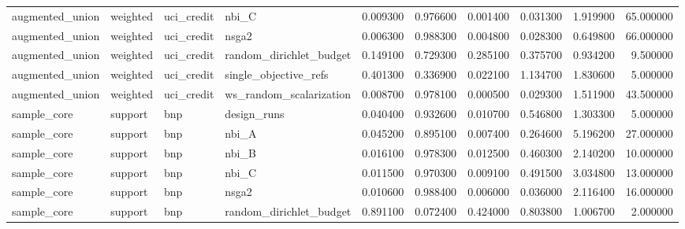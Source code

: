 \begin{landscape}
\begin{longtable}{llllrrrrrr}
augmented\_union & weighted & uci\_credit & nbi\_C & 0.009300 & 0.976600 & 0.001400 & 0.031300 & 1.919900 & 65.000000 \\
augmented\_union & weighted & uci\_credit & nsga2 & 0.006300 & 0.988300 & 0.004800 & 0.028300 & 0.649800 & 66.000000 \\
augmented\_union & weighted & uci\_credit & random\_dirichlet\_budget & 0.149100 & 0.729300 & 0.285100 & 0.375700 & 0.934200 & 9.500000 \\
augmented\_union & weighted & uci\_credit & single\_objective\_refs & 0.401300 & 0.336900 & 0.022100 & 1.134700 & 1.830600 & 5.000000 \\
augmented\_union & weighted & uci\_credit & ws\_random\_scalarization & 0.008700 & 0.978100 & 0.000500 & 0.029300 & 1.511900 & 43.500000 \\
sample\_core & support & bnp & design\_runs & 0.040400 & 0.932600 & 0.010700 & 0.546800 & 1.303300 & 5.000000 \\
sample\_core & support & bnp & nbi\_A & 0.045200 & 0.895100 & 0.007400 & 0.264600 & 5.196200 & 27.000000 \\
sample\_core & support & bnp & nbi\_B & 0.016100 & 0.978300 & 0.012500 & 0.460300 & 2.140200 & 10.000000 \\
sample\_core & support & bnp & nbi\_C & 0.011500 & 0.970300 & 0.009100 & 0.491500 & 3.034800 & 13.000000 \\
sample\_core & support & bnp & nsga2 & 0.010600 & 0.988400 & 0.006000 & 0.036000 & 2.116400 & 16.000000 \\
sample\_core & support & bnp & random\_dirichlet\_budget & 0.891100 & 0.072400 & 0.424000 & 0.803800 & 1.006700 & 2.000000 \\
\end{longtable}\endgroup

\end{landscape}
